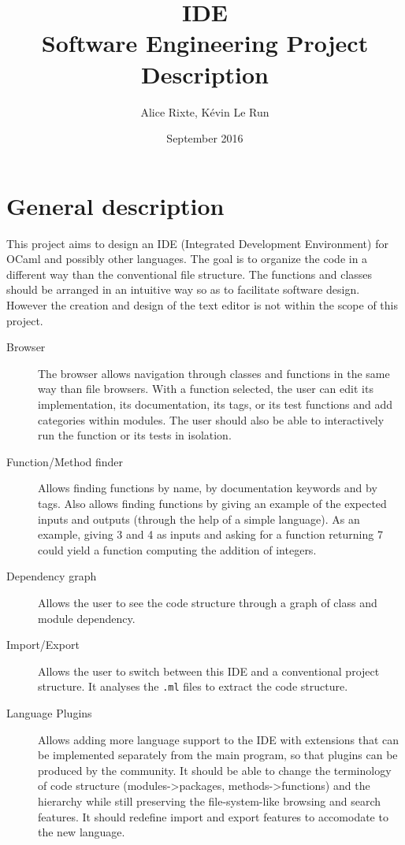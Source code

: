 \documentclass{article}
\title{IDE\\\Large{Software Engineering Project Description}}
\author{Alice Rixte, K\'evin Le Run}
\date{September 2016}
\begin{document}
\maketitle

\section{General description}

This project aims to design an IDE (Integrated Development Environment) for
OCaml and possibly other languages. The goal is to organize the code in a
different way than the conventional file structure. The functions and classes
should be arranged in an intuitive way so as to facilitate software design.
However the creation and design of the text editor is not within the scope of
this project.

\begin{description}

    \item [Browser] The browser allows navigation through classes and functions
        in the same way than file browsers. With a function selected, the user
        can edit its implementation, its documentation, its tags, or its test
        functions and add categories within modules.  The user should also be
        able to interactively run the function or its tests in isolation.

    \item [Function/Method finder] Allows finding functions by name, by
        documentation keywords and by tags. Also allows finding functions by
        giving an example of the expected inputs and outputs (through the help
        of a simple language). As an example, giving 3 and 4 as inputs and
        asking for a function returning 7 could yield a function computing the
        addition of integers.

    \item [Dependency graph] Allows the user to see the code structure through
        a graph of class and module dependency.

    \item [Import/Export] Allows the user to switch between this IDE and a
        conventional project structure. It analyses the \texttt{.ml} files to
        extract the code structure.

    \item [Language Plugins] Allows adding more language support to the IDE
        with extensions that can be implemented separately from the main
        program, so that plugins can be produced by the community. It should be
        able to change the terminology of code structure (modules->packages,
        methods->functions) and the hierarchy while still preserving the
        file-system-like browsing and search features. It should redefine
        import and export features to accomodate to the new language.

\end{description}
\end{document}
